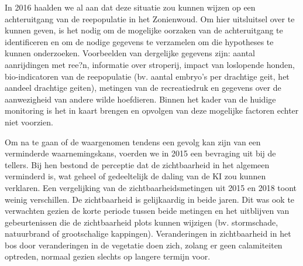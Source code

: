 \documentclass[twoside]{extreport}
\begin{document}
In 2016 haalden we al aan dat deze situatie zou kunnen wijzen op een
achteruitgang van de reepopulatie in het Zonienwoud. Om hier uitsluitsel
over te kunnen geven, is het nodig om de mogelijke oorzaken van de
achteruitgang te identificeren en om de nodige gegevens te verzamelen om
die hypotheses te kunnen onderzoeken. Voorbeelden van dergelijke
gegevens zijn: aantal aanrijdingen met ree?n, informatie over stroperij,
impact van loslopende honden, bio-indicatoren van de reepopulatie (bv.
aantal embryo's per drachtige geit, het aandeel drachtige geiten),
metingen van de recreatiedruk en gegevens over de aanwezigheid van
andere wilde hoefdieren. Binnen het kader van de huidige monitoring is
het in kaart brengen en opvolgen van deze mogelijke factoren echter niet
voorzien.

Om na te gaan of de waargenomen tendens een gevolg kan zijn van een
verminderde waarnemingskans, voerden we in 2015 een bevraging uit bij de
tellers. Bij hen bestond de perceptie dat de zichtbaarheid in het
algemeen verminderd is, wat geheel of gedeeltelijk de daling van de KI
zou kunnen verklaren. Een vergelijking van de zichtbaarheidsmetingen uit
2015 en 2018 toont weinig verschillen. De zichtbaarheid is gelijkaardig
in beide jaren. Dit was ook te verwachten gezien de korte periode tussen
beide metingen en het uitblijven van gebeurtenissen die de zichtbaarheid
plots kunnen wijzigen (bv. stormschade, natuurbrand of grootschalige
kappingen). Veranderingen in zichtbaarheid in het bos door veranderingen
in de vegetatie doen zich, zolang er geen calamiteiten optreden, normaal
gezien slechts op langere termijn voor.

\cleardoublepage


\end{document}
